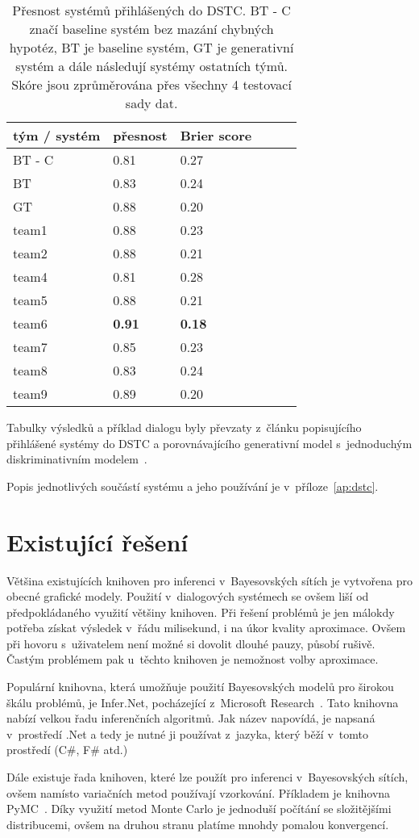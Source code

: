 \begin{table}[H]
\begin{center}
\begin{tabular}{|l|l|l|l|l|l|}
  \hline
tým / systém & přesnost & Brier score \\
\hline
BT - C         & 0.81 & 0.27\\
BT          & 0.83 & 0.24\\
GT          & 0.88 & 0.20\\
team1       & 0.88 & 0.23\\
team2       & 0.88 & 0.21\\
team4         & 0.81 & 0.28\\
team5         & 0.88 & 0.21\\
team6         & \textbf{0.91} & \textbf{0.18}\\
team7         & 0.85 & 0.23\\
team8         & 0.83 & 0.24\\
team9         & 0.89 & 0.20\\
\hline
\end{tabular}
\end{center}
\caption{Přesnost systémů přihlášených do DSTC. BT - C značí baseline systém bez mazání chybných hypotéz, BT je baseline systém, GT je generativní systém a dále následují systémy ostatních týmů. Skóre jsou zprůměrována přes všechny 4 testovací sady dat.}
\label{t:DSTC:ranking}
\end{table}

Tabulky výsledků a příklad dialogu byly převzaty z~článku popisujícího přihlášené systémy do DSTC a porovnávajícího generativní model s~jednoduchým diskriminativním modelem~\cite{zilka2013}.

Popis jednotlivých součástí systému a jeho používání je v~příloze~\ref{ap:dstc}.

\section{Existující řešení}

Většina existujících knihoven pro inferenci v~Bayesovských sítích je vytvořena pro obecné grafické modely.
Použití v~dialogových systémech se ovšem liší od předpokládaného využití většiny knihoven.
Při řešení problémů je jen málokdy potřeba získat výsledek v~řádu milisekund, i na úkor kvality aproximace.
Ovšem při hovoru s~uživatelem není možné si dovolit dlouhé pauzy, působí rušivě.
Častým problémem pak u~těchto knihoven je nemožnost volby aproximace.

Populární knihovna, která umožňuje použití Bayesovských modelů pro širokou škálu problémů, je Infer.Net, pocházející z~Microsoft Research~\cite{InferNET12}.
Tato knihovna nabízí velkou řadu inferenčních algoritmů.
Jak název napovídá, je napsaná v~prostředí .Net a tedy je nutné ji používat z~jazyka, který běží v~tomto prostředí (C\#, F\# atd.)

Dále existuje řada knihoven, které lze použít pro inferenci v~Bayesovských sítích, ovšem namísto variačních metod používají vzorkování.
Příkladem je knihovna PyMC~\cite{patil2010pymc}. 
Díky využití metod Monte Carlo je jednoduší počítání se složitějšími distribucemi, ovšem na druhou stranu platíme mnohdy pomalou konvergencí.
